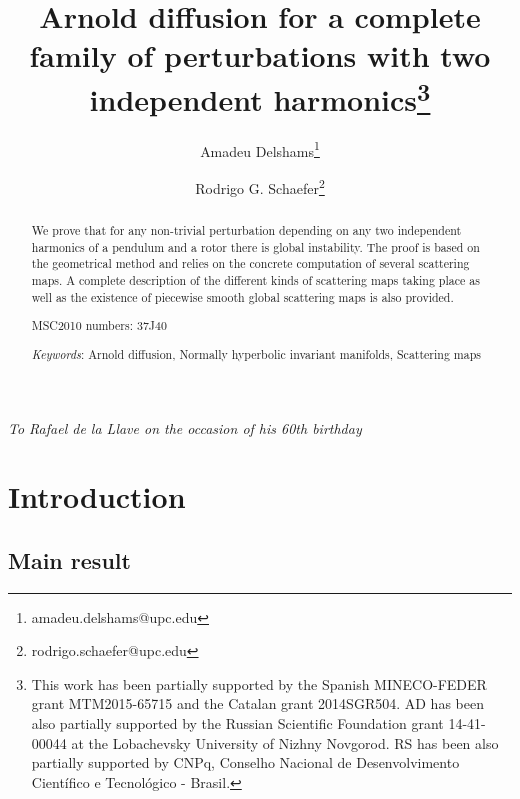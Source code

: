 \documentclass[a4paper,10pt]{article}
\theoremstyle{definition}
\begin{document}
\title{Arnold diffusion for a complete family of perturbations with two independent
      harmonics\footnote{This work has been partially supported by
      the Spanish MINECO-FEDER grant MTM2015-65715 and
      the Catalan grant 2014SGR504. AD has been also partially supported by
      the Russian Scientific Foundation grant 14-41-00044
      at the Lobachevsky University of Nizhny Novgorod. RS has been also partially supported by CNPq, Conselho Nacional de Desenvolvimento Cient\'{i}fico e Tecnol\'{o}gico - Brasil.}}
\author{Amadeu Delshams\thanks{amadeu.delshams@upc.edu}}
\author{Rodrigo G. Schaefer\thanks{rodrigo.schaefer@upc.edu}}
   
\maketitle
\centerline{\emph{To Rafael de la Llave on the occasion of his 60th birthday}}


\begin{abstract}
We prove that for any non-trivial perturbation depending on any two independent harmonics of a pendulum and a rotor there is global instability.
The proof is based on the geometrical method and relies on
the concrete computation of several scattering maps. A complete description of the
different kinds of scattering maps taking place as well as the existence of piecewise smooth global scattering maps
is also provided.
\par\vspace{12pt}
\noindent MSC2010 numbers: 37J40

\noindent\emph{Keywords}:
  Arnold diffusion,
  Normally hyperbolic invariant manifolds,
  Scattering maps
  
  

\end{abstract}

\section{Introduction}
\subsection{Main result}
\end{document}
